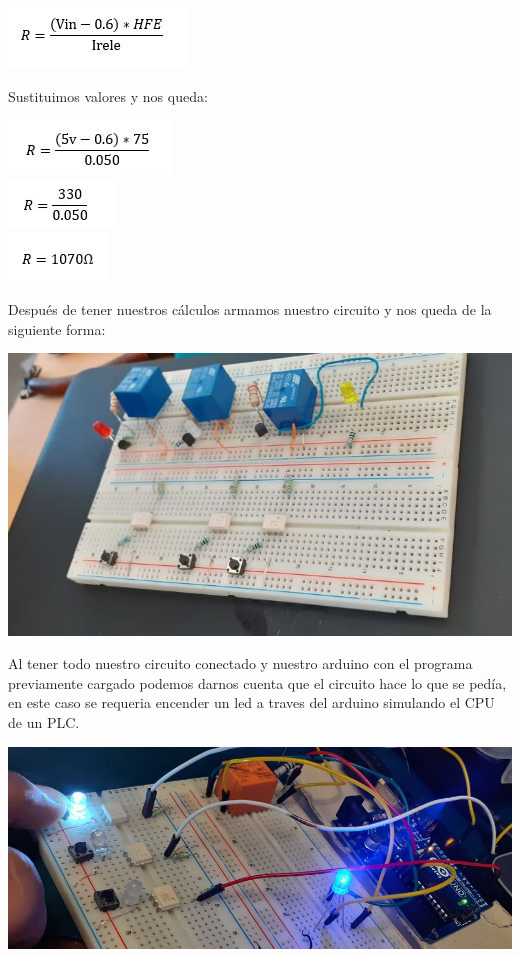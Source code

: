 \documentclass[12pt,a4paper]{article}
\begin{document}
\begin{center}
\includegraphics[scale=1]{imagenes/formula.JPG} 
\end{center}
Sustituimos valores y nos queda:
\begin{center} 
\includegraphics[scale=1]{imagenes/formula2.JPG} \\
\includegraphics[scale=1]{imagenes/formula3.JPG} \\
\includegraphics[scale=1]{imagenes/formulafin.JPG} \\
\end{center}
Después de tener nuestros cálculos armamos nuestro circuito y nos queda de la siguiente forma:\linebreak

\includegraphics[scale=0.9]{imagenes/circuito1.JPG} 
\newpage
\begin{flushleft}
Al tener todo nuestro circuito conectado y nuestro arduino con el programa previamente cargado podemos darnos cuenta que el circuito hace lo que se pedía, en este caso se requeria encender un led a traves del arduino simulando el CPU de un PLC.\linebreak
\end{flushleft}
\includegraphics[scale=0.7]{imagenes/simu2.JPG}
\end{document}
